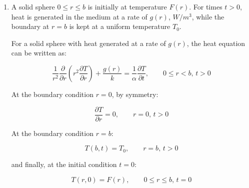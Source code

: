 \documentclass[letterpaper,12pt]{article}
\begin{document}
\begin{enumerate}
    At the boundary condition $r = b$:

    \begin{equation}
    \begin{aligned}
        -k\frac{\partial T}{\partial r}      &= h(T - T_{\infty}) \\
        -k\frac{\partial T}{\partial r}      &= hT \\
        k\frac{\partial T}{\partial r} + hT &= 0, \qquad r = b, \, t > 0
    \end{aligned}
    \end{equation}

    and finally, at the initial condition $t = 0$:

    \begin{equation}
        T(r, 0) = F(r), \qquad 0 \leq r \leq b, \, t = 0
    \end{equation}
    

    \item A solid sphere $0 \leq r \leq b$ is initially at temperature $F\left( r \right)$. For times $t > 0$, heat is generated in the medium at a rate of $g\left( r \right)$, $W/m^3$, while the boundary at $r = b$ is kept at a uniform temperature $T_0$.
    
    For a solid sphere with heat generated at a rate of $g\left( r \right)$, the heat equation can be written as:

    \begin{equation}
        \frac{1}{r^2}\frac{\partial}{\partial r} \left(r^2 \frac{\partial T}{\partial r} \right) + \frac{g\left(r \right)}{k} = \frac{1}{\alpha} \frac{\partial T}{\partial t}, \qquad 0 \leq r < b, \, t > 0
    \end{equation}

    At the boundary condition $r = 0$, by symmetry:

    \begin{equation}
        \frac{\partial T}{\partial r} = 0, \qquad r = 0, \, t > 0
    \end{equation}

    At the boundary condition $r = b$:

    \begin{equation}
        T(b, t) = T_0, \qquad r = b, \, t > 0
    \end{equation}

    and finally, at the initial condition $t = 0$:

    \begin{equation}
        T(r, 0) = F(r), \qquad 0 \leq r \leq b, \, t = 0
    \end{equation}

\end{enumerate}
\end{document}
